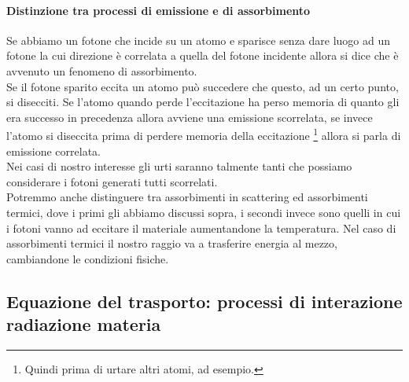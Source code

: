 \paragraph{Distinzione tra processi di emissione e di assorbimento}%
Se abbiamo un fotone che incide su un atomo e sparisce senza dare luogo ad un fotone la cui direzione è correlata a quella del fotone incidente allora si dice che è avvenuto un fenomeno di assorbimento.\\
Se il fotone sparito eccita un atomo può succedere che questo, ad un certo punto, si disecciti. Se l'atomo quando perde l'eccitazione ha perso memoria di quanto gli era successo in precedenza allora avviene una emissione scorrelata, se invece l'atomo si diseccita prima di perdere memoria della eccitazione \footnote{Quindi prima di urtare altri atomi, ad esempio.} allora si parla di emissione correlata.\\
Nei casi di nostro interesse gli urti saranno talmente tanti che possiamo considerare i fotoni generati tutti scorrelati.\\
Potremmo anche distinguere tra assorbimenti in scattering ed assorbimenti termici, dove i primi gli abbiamo discussi sopra, i secondi invece sono quelli in cui i fotoni vanno ad eccitare il materiale aumentandone la temperatura. Nel caso di assorbimenti termici il nostro raggio va a trasferire energia al mezzo, cambiandone le condizioni fisiche.\\
\subsection{Equazione del trasporto: processi di interazione radiazione materia}%
